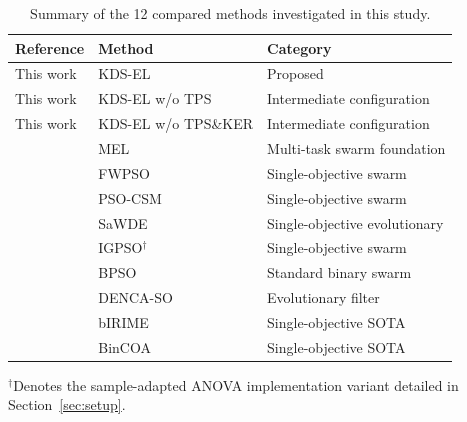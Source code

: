 \begin{table}[!htb]
\centering
\ktablecaption
\small
\caption{Summary of the 12 compared methods investigated in this study.}
\label{T1}
\renewcommand{\arraystretch}{1.25}
\setlength{\tabcolsep}{8pt}
\begin{tabular*}{\linewidth}{@{\extracolsep{\fill}}lll@{}}
\toprule
Reference & Method & Category \\
\midrule
This work & KDS-EL & Proposed \\
This work & KDS-EL w/o TPS & Intermediate configuration \\
This work & KDS-EL w/o TPS\&KER & Intermediate configuration \\
\cite{mel2024} & MEL & Multi-task swarm foundation \\
\midrule
\cite{wangjia2022} & FWPSO & Single-objective swarm \\
\cite{wei2025} & PSO-CSM & Single-objective swarm \\
\cite{wang2022} & SaWDE & Single-objective evolutionary \\
\cite{xuezhang2024} & IGPSO$^{\dagger}$ & Single-objective swarm \\
\cite{kennedy1997} & BPSO & Standard binary swarm \\
\midrule
\cite{hancer2023} & DENCA-SO & Evolutionary filter \\
\cite{su2024} & bIRIME & Single-objective SOTA \\
\cite{shikoun2024} & BinCOA & Single-objective SOTA \\
\bottomrule
\end{tabular*}
\vspace{2pt}
\par\raggedright\footnotesize
$^{\dagger}$Denotes the sample-adapted ANOVA implementation variant detailed in Section~\ref{sec:setup}.
\end{table}
